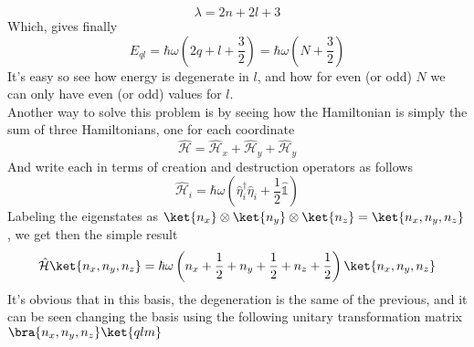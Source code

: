 \documentclass[a4paper, 11pt]{book}
\newcommand{\1}{\opr{\mathds{1}}}
\newcommand{\ham}{\mathcal{H}}
\newcommand{\opr}[1]{\hat{#1}}
\newcommand{\adj}[2][]{#2^{\dagger#1}}
\theoremstyle{plain}
\begin{document}
	\begin{equation}
		\lambda=2n+2l+3
		\label{eq:engquant}
	\end{equation}
	Which, gives finally
	\begin{equation}
		E_{ql}=\hbar\omega\left( 2q+l+\frac{3}{2} \right)=\hbar\omega\left( N+\frac{3}{2} \right)
		\label{eq:energy3dqho}
	\end{equation}
	It's easy so see how energy is degenerate in $l$, and how for even (or odd) $N$ we can only have even (or odd) values for $l$.\\
	Another way to solve this problem is by seeing how the Hamiltonian is simply the sum of three Hamiltonians, one for each coordinate
	\begin{equation*}
		\opr{\ham}=\opr{\ham}_x+\opr{\ham}_y+\opr{\ham}_y
	\end{equation*}
	And write each in terms of creation and destruction operators as follows
	\begin{equation*}
		\opr{\ham}_i=\hbar\omega\left( \adj{\opr{\eta}}_i\opr{\eta}_i+\frac{1}{2}\1 \right)
	\end{equation*}
	Labeling the eigenstates as $\ket{n_x}\otimes\ket{n_y}\otimes\ket{n_z}=\ket{n_x,n_y,n_z}$, we get then the simple result
	\begin{equation*}
		\opr{\ham}\ket{n_x,n_y,n_z}=\hbar\omega\left( n_x+\frac{1}{2}+n_y+\frac{1}{2}+n_z+\frac{1}{2} \right)\ket{n_x,n_y,n_z}
	\end{equation*}
	It's obvious that in this basis, the degeneration is the same of the previous, and it can be seen changing the basis using the following unitary transformation matrix $\bra{n_x,n_y,n_z}\ket{qlm}$
\end{document}
